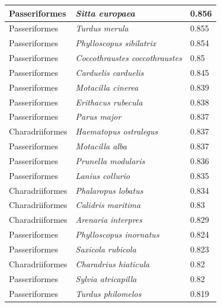\documentclass{article}
\begin{document}
\begin{longtable}{|p{} | p{} | p{} |}
  Passeriformes   & \textit{Sitta europaea}                & 0.856                \\ \hline
  Passeriformes   & \textit{Turdus merula}                 & 0.855                \\ \hline
  Passeriformes   & \textit{Phylloscopus sibilatrix}       & 0.854                \\ \hline
  Passeriformes   & \textit{Coccothraustes coccothraustes} & 0.85                 \\ \hline
  Passeriformes   & \textit{Carduelis carduelis}           & 0.845                \\ \hline
  Passeriformes   & \textit{Motacilla cinerea}             & 0.839                \\ \hline
  Passeriformes   & \textit{Erithacus rubecula}            & 0.838                \\ \hline
  Passeriformes   & \textit{Parus major}                   & 0.837                \\ \hline
  Charadriiformes & \textit{Haematopus ostralegus}         & 0.837                \\ \hline
  Passeriformes   & \textit{Motacilla alba}                & 0.837                \\ \hline
  Passeriformes   & \textit{Prunella modularis}            & 0.836                \\ \hline
  Passeriformes   & \textit{Lanius collurio}               & 0.835                \\ \hline
  Charadriiformes & \textit{Phalaropus lobatus}            & 0.834                \\ \hline
  Charadriiformes & \textit{Calidris maritima}             & 0.83                 \\ \hline
  Charadriiformes & \textit{Arenaria interpres}            & 0.829                \\ \hline
  Passeriformes   & \textit{Phylloscopus inornatus}        & 0.824                \\ \hline
  Passeriformes   & \textit{Saxicola rubicola}             & 0.823                \\ \hline
  Charadriiformes & \textit{Charadrius hiaticula}          & 0.82                 \\ \hline
  Passeriformes   & \textit{Sylvia atricapilla}            & 0.82                 \\ \hline
  Passeriformes   & \textit{Turdus philomelos}             & 0.819                \\ \hline

\end{longtable}
\end{document}
